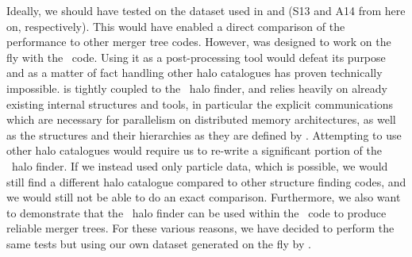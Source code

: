 \begin{enumerate}

\end{enumerate}

Ideally, we should have tested \acacia on the dataset used in
\citet{SUSSING_COMPARISON} and \citet{SUSSING_HALOFINDER} (S13 and A14
from here on, respectively).  This would
have enabled a direct comparison of the performance to other merger
tree codes.  However, \acacia was designed to work on the fly
with the \ramses\ code.  Using it as a post-processing tool would
defeat its purpose and as a matter of fact handling other halo
catalogues  has proven technically impossible. \acacia is
tightly coupled to the \phew\ halo finder, and relies heavily on
already existing internal structures and tools, in particular the
explicit communications which are necessary for parallelism on
distributed memory architectures, as well as the structures and
their hierarchies as they are defined by \phew. Attempting to use
other halo catalogues would require us to re-write a significant
portion of the \phew\ halo finder. If we instead used only particle
data, which is possible, we would still find a different halo catalogue
compared to other structure finding codes, and we would still not be
able to do an exact comparison. Furthermore, we also want to demonstrate that the
\phew\ halo finder can be used within the \ramses\ code to produce
reliable merger trees.  For these various reasons, we have decided to
perform the same tests but using our own dataset generated on the fly by
\ramses.

